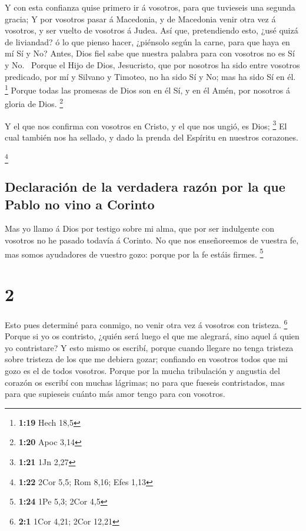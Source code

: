  Y con esta confianza quise primero ir á vosotros, para
que tuvieseis una segunda gracia;  Y por vosotros pasar á
Macedonia, y de Macedonia venir otra vez á vosotros, y ser vuelto de
vosotros á Judea.  Así que, pretendiendo esto, ¿usé quizá
de liviandad? ó lo que pienso hacer, ¿piénsolo según la carne, para que
haya en mí Sí y No?  Antes, Dios fiel sabe que nuestra
palabra para con vosotros no es Sí y No.~ Porque el Hijo
de Dios, Jesucristo, que por nosotros ha sido entre vosotros predicado,
por mí y Silvano y Timoteo, no ha sido Sí y No; mas ha sido Sí en él.
\footnote{\textbf{1:19} Hech 18,5}  Porque todas las
promesas de Dios son en él Sí, y en él Amén, por nosotros á gloria de
Dios. \footnote{\textbf{1:20} Apoc 3,14}

 Y el que nos confirma con vosotros en Cristo, y el que
nos ungió, es Dios; \footnote{\textbf{1:21} 1Jn 2,27}  El
cual también nos ha sellado, y dado la prenda del Espíritu en nuestros
corazones.

\footnote{\textbf{1:22} 2Cor 5,5; Rom 8,16; Efes 1,13}

\hypertarget{declaraciuxf3n-de-la-verdadera-razuxf3n-por-la-que-pablo-no-vino-a-corinto}{%
\subsection{Declaración de la verdadera razón por la que Pablo no vino a
Corinto}\label{declaraciuxf3n-de-la-verdadera-razuxf3n-por-la-que-pablo-no-vino-a-corinto}}

 Mas yo llamo á Dios por testigo sobre mi alma, que por
ser indulgente con vosotros no he pasado todavía á Corinto.
 No que nos enseñoreemos de vuestra fe, mas somos
ayudadores de vuestro gozo: porque por la fe estáis firmes. \footnote{\textbf{1:24}
  1Pe 5,3; 2Cor 4,5}

\hypertarget{section-1}{%
\section{2}\label{section-1}}

 Esto pues determiné para conmigo, no venir otra vez á
vosotros con tristeza. \footnote{\textbf{2:1} 1Cor 4,21; 2Cor 12,21}
 Porque si yo os contristo, ¿quién será luego el que me
alegrará, sino aquel á quien yo contristare?  Y esto mismo
os escribí, porque cuando llegare no tenga tristeza sobre tristeza de
los que me debiera gozar; confiando en vosotros todos que mi gozo es el
de todos vosotros.  Porque por la mucha tribulación y
angustia del corazón os escribí con muchas lágrimas; no para que fueseis
contristados, mas para que supieseis cuánto más amor tengo para con
vosotros.

